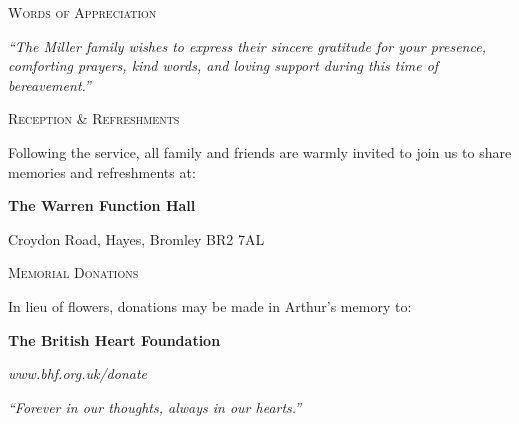 
\begin{center}
  \vspace*{6mm}
  
  {\large\scshape\color{primary} Words of Appreciation}
  
  \vspace{4mm}
  \begin{minipage}{0.88\linewidth}
    \centering\small\itshape
    ``The Miller family wishes to express their sincere gratitude for your presence, comforting prayers, kind words, and loving support during this time of bereavement.''
  \end{minipage}

  \vspace{10mm}
  \thinseparator
  \vspace{6mm}

  {\large\scshape\color{primary} Reception \& Refreshments}
  
  \vspace{3mm}
  {\small Following the service, all family and friends are warmly invited to join us to share memories and refreshments at:\par}
  \vspace{3mm}
  {\textbf{The Warren Function Hall}\par}
  {\small Croydon Road, Hayes, Bromley BR2 7AL\par}

  \vspace{10mm}
  \thinseparator
  \vspace{6mm}

  {\large\scshape\color{primary} Memorial Donations}
  
  \vspace{3mm}
  {\small In lieu of flowers, donations may be made in Arthur's memory to:\par}
  \vspace{2mm}
  {\textbf{The British Heart Foundation}\par}
  {\small \textit{www.bhf.org.uk/donate}\par}

  \vfill
  
  {\small\textit{``Forever in our thoughts, always in our hearts.''}}
  \vspace*{4mm}
\end{center}
